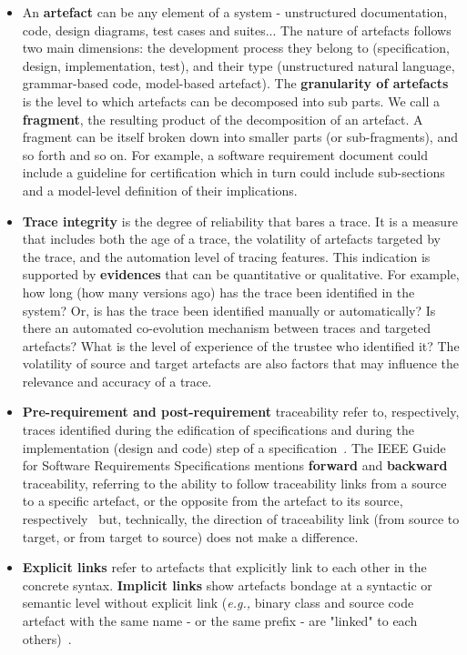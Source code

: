 \begin{itemize}
	\item An \textbf{artefact} can be any element of a system - \eg unstructured documentation, code, design diagrams, test cases and suites... The nature of artefacts follows two main dimensions: the development process they belong to (\eg specification, design, implementation, test), and their type (\eg unstructured natural language, grammar-based code, model-based artefact). The \textbf{granularity of artefacts} is the level to which artefacts can be decomposed into sub parts. We call a \textbf{fragment}, the resulting product of the decomposition of an artefact. A fragment can be itself broken down into smaller parts (or sub-fragments), and so forth and so on. For example, a software requirement document could include a guideline for certification which in turn could include sub-sections and a model-level definition of their implications.
	
	\item \textbf{Trace integrity} is the degree of reliability that bares a trace. It is a measure that includes both the age of a trace, the volatility of artefacts targeted by the trace, and the automation level of tracing features. This indication is supported by \textbf{evidences} that can be quantitative or qualitative. For example, how long (how many versions ago) has the trace been identified in the system? Or, is has the trace been identified manually or automatically? Is there an automated co-evolution mechanism between traces and targeted artefacts? What is the level of experience of the trustee who identified it? 
	The volatility of source and target artefacts are also factors that may influence the relevance and accuracy of a trace.
	
	\item \textbf{Pre-requirement and post-requirement} traceability refer to, respectively, traces identified during the edification of specifications and during the implementation (design and code) step of a specification~\cite{gotel1994}.
	The IEEE Guide for Software Requirements Specifications mentions \textbf{forward} and \textbf{backward} traceability, referring to the ability to follow traceability links from a source to a specific artefact, or the opposite from the artefact to its source, respectively~\cite{ieeeglossary-req} but, technically, the direction of traceability link (from source to target, or from target to source) does not make a difference.
	
	\item \textbf{Explicit links} refer to artefacts that explicitly link to each other in the concrete syntax. \textbf{Implicit links} show artefacts bondage at a syntactic or semantic level without explicit link (\textit{e.g.,} binary class and source code artefact with the same name - or the same prefix - are "linked" to each others)~\cite{paige2010-MDE-Traceability-classifications}.
	

\end{itemize}
